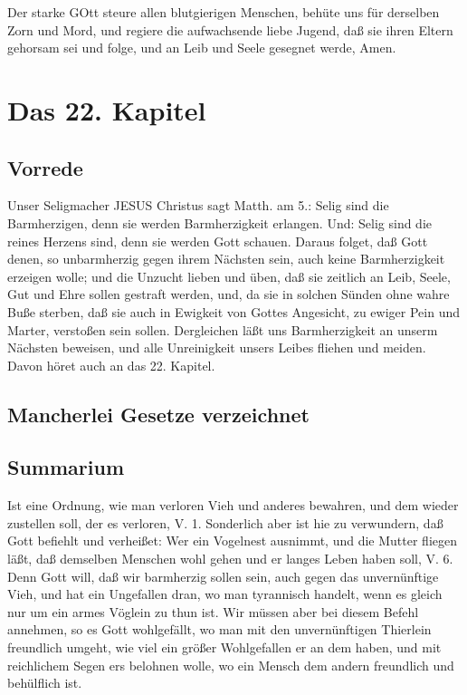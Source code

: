 Der starke GOtt steure allen blutgierigen Menschen, behüte uns für derselben Zorn und Mord, und regiere die aufwachsende liebe Jugend, daß sie ihren Eltern gehorsam sei und folge, und an Leib und Seele gesegnet werde, Amen.

\chapter{Das 22. Kapitel}

\section{Vorrede}

Unser Seligmacher JESUS Christus sagt Matth. am 5.: Selig sind die Barmherzigen, denn sie werden Barmherzigkeit erlangen. Und: Selig sind die reines Herzens sind, denn sie werden Gott schauen. Daraus folget, daß Gott denen, so unbarmherzig gegen ihrem Nächsten sein, auch keine Barmherzigkeit erzeigen wolle; und die Unzucht lieben und üben, daß sie zeitlich an Leib, Seele, Gut und Ehre sollen gestraft werden, und, da sie in solchen Sünden ohne wahre Buße sterben, daß sie auch in Ewigkeit von Gottes Angesicht, zu ewiger Pein und Marter, verstoßen sein sollen. Dergleichen läßt uns Barmherzigkeit an unserm Nächsten beweisen, und alle Unreinigkeit unsers Leibes fliehen und meiden. Davon höret auch an das 22. Kapitel.

\section{Mancherlei Gesetze verzeichnet}

\section{Summarium}

Ist eine Ordnung, wie man verloren Vieh und anderes bewahren, und dem wieder zustellen soll, der es verloren, V. 1. Sonderlich aber ist hie zu verwundern, daß Gott befiehlt und verheißet: Wer ein Vogelnest ausnimmt, und die Mutter fliegen läßt, daß demselben Menschen wohl gehen und er langes Leben haben soll, V. 6. Denn Gott will, daß wir barmherzig sollen sein, auch gegen das unvernünftige Vieh, und hat ein Ungefallen dran, wo man tyrannisch handelt, wenn es gleich nur um ein armes Vöglein zu thun ist. Wir müssen aber bei diesem Befehl annehmen, so es Gott wohlgefällt, wo man mit den unvernünftigen Thierlein freundlich umgeht, wie viel ein größer Wohlgefallen er an dem haben, und mit reichlichem Segen ers belohnen wolle, wo ein Mensch dem andern freundlich und behülflich ist.

